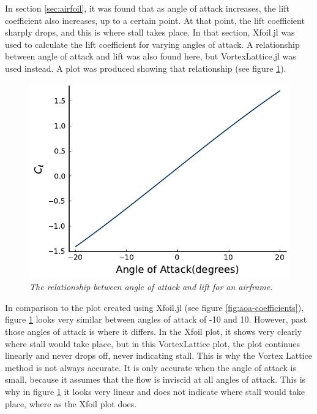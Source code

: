 \documentclass[journal]{new-aiaa}
\begin{document}
	In section \ref{sec:airfoil}, it was found that as angle of attack increases, the lift coefficient also increases, up to a certain point. At that point, the lift coefficient sharply drops, and this is where stall takes place. In that section, Xfoil.jl \cite{McDonnell} was used to calculate the lift coefficient for varying angles of attack. A relationship between angle of attack and lift was also found here, but VortexLattice.jl \cite{McDonnell-Ning} was used instead. A plot was produced showing that relationship (see figure \ref{fig:aoa-lift}).\\
	
	\begin{figure}[H]
		\centering
		\includegraphics{../graphics/aoa-lift.pdf}
		\caption{\emph{The relationship between angle of attack and lift for an airframe.}}
		\label{fig:aoa-lift}
	\end{figure}
	
	In comparison to the plot created using Xfoil.jl \cite{McDonnell} (see figure \ref{fig:aoa-coefficients}), figure \ref{fig:aoa-lift} looks very similar between angles of attack of -10 and 10. However, past those angles of attack is where it differs. In the Xfoil plot, it shows very clearly where stall would take place, but in this VortexLattice plot, the plot continues linearly and never drops off, never indicating stall. This is why the Vortex Lattice method is not always accurate. It is only accurate when the angle of attack is small, because it assumes that the flow is inviscid at all angles of attack. This is why in figure \ref{fig:aoa-lift} it looks very linear and does not indicate where stall would take place, where as the Xfoil plot does.\\
	
\end{document}
